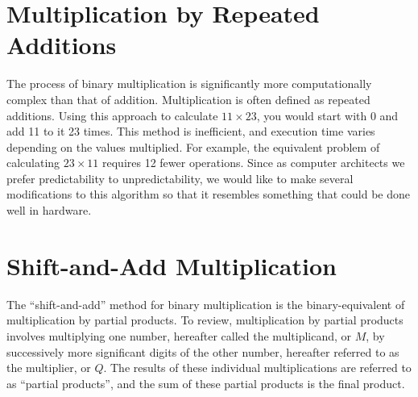 \documentclass{article}
\begin{document}
\section{Multiplication by Repeated Additions}
The process of binary multiplication is significantly more computationally complex than that of addition.
Multiplication is often defined as repeated additions.
Using this approach to calculate $11 \times 23$, you would start with 0 and add 11 to it 23 times.
This method is inefficient, and execution time varies depending on the values multiplied.
For example, the equivalent problem of calculating $23 \times 11$ requires 12 fewer operations.
Since as computer architects we prefer predictability to unpredictability, we would like to make several modifications to this algorithm so that it resembles something that could be done well in hardware.

\section{Shift-and-Add Multiplication}
The ``shift-and-add'' method for binary multiplication is the binary-equivalent of multiplication by partial products.
To review, multiplication by partial products involves multiplying one number, hereafter called the multiplicand, or $M$, by successively more significant digits of the other number, hereafter referred to as the multiplier, or $Q$.
The results of these individual multiplications are referred to as ``partial products'', and the sum of these partial products is the final product.

\end{document}
